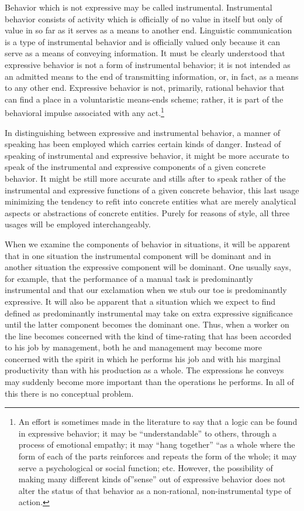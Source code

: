 \documentclass[twoside,symmetric,nobib,justified]{tufte-book}
\begin{document}
Behavior which is not expressive may be called instrumental.
Instrumental behavior consists of activity which is officially of no
value in itself but only of value in so far as it serves as a means to
another end. Linguistic communication is a type of instrumental behavior
and is officially valued only because it can serve as a means of
conveying information. It must be clearly understood that expressive
behavior is not a form of instrumental behavior; it is not intended as
an admitted means to the end of transmitting information, or, in fact,
as a means to any other end. Expressive behavior is not, primarily,
rational behavior that can find a place in a voluntaristic means-ends
scheme; rather, it is part of the behavioral impulse associated with any
act.\footnote{An effort is sometimes made in the literature to say that
  a logic can be found in expressive behavior; it may be
  ``understandable'' to others, through a process of emotional empathy;
  it may ``hang together'' ``as a whole where the form of each of the
  parts reinforces and repeats the form of the whole; it may serve a
  psychological or social function; etc. However, the possibility of
  making many different kinds of''sense'' out of expressive behavior
  does not alter the status of that behavior as a non-rational,
  non-instrumental type of action.}

In distinguishing between expressive and instrumental behavior, a manner
of speaking has been employed which carries certain kinds of danger.
Instead of speaking of instrumental and expressive behavior, it might be
more accurate to speak of the instrumental and expressive components of
a given concrete behavior. It might be still more accurate and stills
after to speak rather of the instrumental and expressive functions of a
given concrete behavior, this last usage minimizing the tendency to
refit into concrete entities what are merely analytical aspects or
abstractions of concrete entities. Purely for reasons of style, all
three usages will be employed interchangeably.

When we examine the components of behavior in situations, it will be
apparent that in one situation the instrumental component will be
dominant and in another situation the expressive component will be
dominant. One usually says, for example, that the performance of a
manual task is predominantly instrumental and that our exclamation when
we stub our toe is predominantly expressive. It will also be apparent
that a situation which we expect to find defined as predominantly
instrumental may take on extra expressive significance until the latter
component becomes the dominant one. Thus, when a worker on the line
becomes concerned with the kind of time-rating that has been accorded to
his job by management, both he and management may become more concerned
with the spirit in which he performs his job and with his marginal
productivity than with his production as a whole. The expressions he
conveys may suddenly become more important than the operations he
performs. In all of this there is no conceptual problem.
\end{document}
